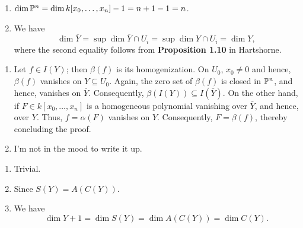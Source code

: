 \begin{exercise}
\begin{enumerate}[label=(\alph*)]
    \item $\dim\mathbb{P}^n = \dim k[x_0,\dots,x_n] - 1 = n + 1 - 1 = n$.
    \item We have 
    \begin{equation*}
        \dim\overline Y = \sup\dim\overline Y\cap U_i = \sup\dim Y\cap U_i = \dim Y,
    \end{equation*}
    where the second equality follows from \textbf{Proposition 1.10} in Hartshorne.
\end{enumerate}
\end{exercise}

\begin{exercise}
\end{exercise}

\begin{exercise}
\begin{enumerate}[label=(\alph*)]
    \item Let $f\in I(Y)$; then $\beta(f)$ is its homogenization. On $U_0$, $x_0\ne 0$ and hence, $\beta(f)$ vanishes on $Y\subseteq U_0$. Again, the zero set of $\beta(f)$ is closed in $\mathbb{P}^n$, and hence, vanishes on $\overline Y$. Consequently, $\beta(I(Y))\subseteq I(\overline Y)$. On the other hand, if $F\in k[x_0,\dots,x_n]$ is a homogeneous polynomial vanishing over $\overline Y$, and hence, over $Y$. Thus, $f = \alpha(F)$ vanishes on $Y$. Consequently, $F = \beta(f)$, thereby concluding the proof.
    \item I'm not in the mood to write it up.
\end{enumerate}
\end{exercise}

\begin{exercise}
\begin{enumerate}[label=(\alph*)]
    \item Trivial.
    \item Since $S(Y) = A(C(Y))$.
    \item We have 
    \begin{equation*}
        \dim Y + 1 = \dim S(Y) = \dim A(C(Y)) = \dim C(Y).
    \end{equation*}
\end{enumerate}
\end{exercise}

\setcounter{exercise}{11}

